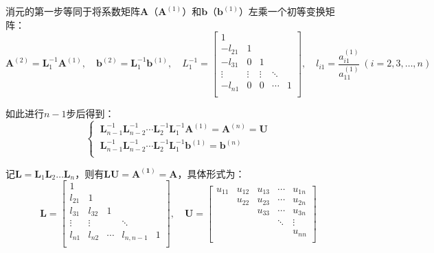 消元的第一步等同于将系数矩阵$\boldsymbol{A}$（$\boldsymbol{A}^{(1)}$）和$\boldsymbol{b}$（$\boldsymbol{b}^{(1)}$）左乘一个初等变换矩阵：
\begin{equation*}
    \boldsymbol{A}^{(2)} = \boldsymbol{L}_1^{-1} \boldsymbol{A}^{(1)},\quad \boldsymbol{b}^{(2)} = \boldsymbol{L}_1^{-1} \boldsymbol{b}^{(1)},\quad L_1^{-1} = \begin{bmatrix}
        1 & \  & \ & \ & \  \\
        -l_{21} & 1 & \ & \ & \  \\
        -l_{31} & 0 & 1 & \ & \  \\
        \vdots & \vdots & \vdots & \ddots & \  \\
        -l_{n1} & 0 & 0 & \cdots & 1 \\
    \end{bmatrix},\quad l_{i1} = \frac{a_{i1}^{(1)}}{a_{11}^{(1)}}\ (i=2,3,\dots,n)
\end{equation*}

如此进行$n-1$步后得到：
\begin{equation*}
    \begin{cases}
        \ \boldsymbol{L}_{n-1}^{-1} \boldsymbol{L}_{n-2}^{-1} \cdots \boldsymbol{L}_{2}^{-1} \boldsymbol{L}_{1}^{-1} \boldsymbol{A}^{(1)} = \boldsymbol{A}^{(n)} = \boldsymbol{U} \\
        \ \boldsymbol{L}_{n-1}^{-1} \boldsymbol{L}_{n-2}^{-1} \cdots \boldsymbol{L}_{2}^{-1} \boldsymbol{L}_{1}^{-1} \boldsymbol{b}^{(1)} = \boldsymbol{b}^{(n)} \\
    \end{cases}
\end{equation*}

记$\boldsymbol{L} = \boldsymbol{L}_1 \boldsymbol{L}_2 \dots \boldsymbol{L}_n$，则有$\boldsymbol{LU} = \boldsymbol{A^{(1)}} = \boldsymbol{A}$，具体形式为：
\begin{equation*}
    \boldsymbol{L} = \begin{bmatrix}
        1 & \ & \ & \ & \ \\
        l_{21} & 1 & \ & \ & \ \\
        l_{31} & l_{32} & 1 & \ & \ \\
        \vdots & \vdots & \ & \ddots & \ \\
        l_{n1} & l_{n2} & \cdots & l_{n,n-1} & 1 \\ 
    \end{bmatrix},\quad \boldsymbol{U} = 
    \begin{bmatrix}
        u_{11} & u_{12} & u_{13} & \cdots & u_{1n} \\
        \      & u_{22} & u_{23} & \cdots & u_{2n} \\
        \      & \      & u_{33} & \cdots & u_{3n} \\
        \      & \      & \      & \ddots & \vdots \\
        \      & \      & \      & \      & u_{nn} \\
    \end{bmatrix}
\end{equation*}

